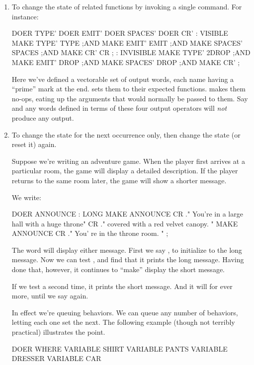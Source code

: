 \begin{enumerate}
\item To change the state of related functions by invoking a single command. For
instance:

\begin{Code}
DOER TYPE'
DOER EMIT'
DOER SPACES'
DOER CR'
: VISIBLE     MAKE TYPE'  TYPE ;AND
              MAKE EMIT'  EMIT ;AND
              MAKE SPACES'  SPACES ;AND
              MAKE CR'  CR ;
: INVISIBLE   MAKE TYPE'  2DROP ;AND
              MAKE EMIT'  DROP ;AND
              MAKE SPACES'  DROP ;AND
              MAKE CR'  ;
\end{Code}
Here we've defined a vectorable set of output words, each name having a
``prime'' mark at the end.  sets them to their expected functions.
 makes them no-ops, eating up the arguments that would normally
be passed to them. Say  and any words defined in terms
of these four output operators will \emph{not} produce any output.

\item To change the state for the next occurrence only, then change the state (or
reset it) again.

Suppose we're writing an adventure game. When the player first arrives at
a particular room, the game will display a detailed description. If the player
returns to the same room later, the game will show a shorter message.

\goodbreak
We write:
\begin{Code}
DOER ANNOUNCE
: LONG MAKE ANNOUNCE
   CR ." You're in a large hall with a huge throne"
   CR  ." covered with a red velvet canopy. "
         MAKE ANNOUNCE
   CR ." You' re in the throne room. " ;
\end{Code}
The word  will display either message. First we say , to
initialize  to the long message. Now we can test ,
and find that it prints the long message. Having done that,
however, it continues to ``make''  display the short message.

If we test  a second time, it prints the short message. And it
will for ever more, until we say  again.

In effect we're queuing behaviors. We can queue any number of behaviors,
letting each one set the next. The following example (though not terribly
practical) illustrates the point.

\begin{Code}
DOER WHERE
VARIABLE SHIRT
VARIABLE PANTS
VARIABLE DRESSER
VARIABLE CAR


\end{Code}
\end{enumerate}
